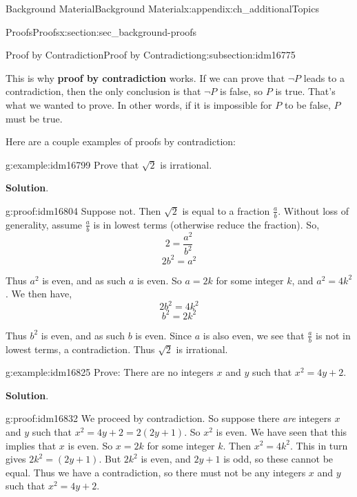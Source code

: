 \documentclass[oneside,10pt,]{book}
\newcommand{\terminology}[1]{\textbf{#1}}
\numberwithin{equation}{chapter}
\begin{document}
\begin{appendixptx}{Background Material}{}{Background Material}{}{}{x:appendix:ch_additionalTopics}
\begin{sectionptx}{Proofs}{}{Proofs}{}{}{x:section:sec_background-proofs}
\begin{subsectionptx}{Proof by Contradiction}{}{Proof by Contradiction}{}{}{g:subsection:idm16775}
\par
This is why \terminology{proof by contradiction} works. If we can prove that \(\neg P\) leads to a contradiction, then the only conclusion is that \(\neg P\) is false, so \(P\) is true. That's what we wanted to prove. In other words, if it is impossible for \(P\) to be false, \(P\) must be true.%
\par
Here are a couple examples of proofs by contradiction:%
\begin{example}{}{g:example:idm16799}%
Prove that \(\sqrt{2}\) is irrational.%
\par\smallskip%
\noindent\textbf{Solution}.\hypertarget{g:solution:idm16803}{}\quad{}\begin{proofptx}{}{g:proof:idm16804}
Suppose not. Then \(\sqrt 2\) is equal to a fraction \(\frac{a}{b}\). Without loss of generality, assume \(\frac{a}{b}\) is in lowest terms (otherwise reduce the fraction). So,%
\begin{equation*}
2 = \frac{a^2}{b^2}
\end{equation*}
%
\begin{equation*}
2b^2 = a^2
\end{equation*}
%
\par
Thus \(a^2\) is even, and as such \(a\) is even. So \(a = 2k\) for some integer \(k\), and \(a^2 = 4k^2\). We then have,%
\begin{equation*}
2b^2 = 4k^2
\end{equation*}
%
\begin{equation*}
b^2 = 2k^2
\end{equation*}
%
\par
Thus \(b^2\) is even, and as such \(b\) is even. Since \(a\) is also even, we see that \(\frac{a}{b}\) is not in lowest terms, a contradiction. Thus \(\sqrt 2\) is irrational.%
\end{proofptx}
\end{example}
\begin{example}{}{g:example:idm16825}%
Prove: There are no integers \(x\) and \(y\) such that \(x^2  = 4y + 2\).%
\par\smallskip%
\noindent\textbf{Solution}.\hypertarget{g:solution:idm16831}{}\quad{}\begin{proofptx}{}{g:proof:idm16832}
We proceed by contradiction. So suppose there \emph{are} integers \(x\) and \(y\) such that \(x^2 = 4y + 2 = 2(2y + 1)\). So \(x^2\) is even. We have seen that this implies that \(x\) is even. So \(x = 2k\) for some integer \(k\). Then \(x^2 = 4k^2\). This in turn gives \(2k^2 = (2y + 1)\). But \(2k^2\) is even, and \(2y + 1\) is odd, so these cannot be equal. Thus we have a contradiction, so there must not be any integers \(x\) and \(y\) such that \(x^2 = 4y + 2\).%

\end{proofptx}
\end{example}
\end{subsectionptx}
\end{sectionptx}
\end{appendixptx}
\end{document}

